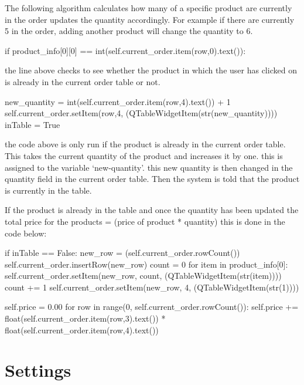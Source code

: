 The following algorithm calculates how many of a specific product are currently in the order updates the quantity accordingly. For example if there are currently 5 in the order, adding another product will change the quantity to 6.


\begin{python}
if product_info[0][0] == int(self.current_order.item(row,0).text()):
\end{python}

the line above checks to see whether the product in which the user has clicked on is already in the current order table or not.

\begin{python}
new_quantity = int(self.current_order.item(row,4).text()) + 1
self.current_order.setItem(row,4, (QTableWidgetItem(str(new_quantity))))
inTable  = True
\end{python}

the code above is only run if the product is already in the current order table. This takes the current quantity of the product and increases it by one. this is assigned to the variable `new-quantity'. this new quantity is then changed in the quantity field in the current order table. Then the system is told that the product is currently in the table.

If the product is already in the table and once the quantity has been updated the total price for the products = (price of product * quantity) this is done in the code below:

\begin{python}
if inTable == False:
            new_row = (self.current_order.rowCount())
            self.current_order.insertRow(new_row)
            count = 0
            for item in product_info[0]:
                self.current_order.setItem(new_row, count, (QTableWidgetItem(str(item))))
                count += 1
            self.current_order.setItem(new_row, 4, (QTableWidgetItem(str(1))))

        self.price = 0.00
        for row in range(0, self.current_order.rowCount()):
            self.price += float(self.current_order.item(row,3).text()) * float(self.current_order.item(row,4).text())
\end{python}


\section{Settings}

